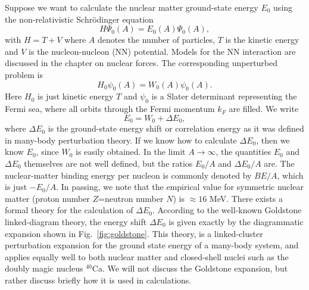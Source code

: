 Suppose we want to calculate the nuclear matter ground-state
energy $E_0$ using the non-relativistic Schr\"{o}dinger equation
\begin{equation}
      H\Psi_0(A)=E_0(A)\Psi_0(A),
\end{equation}
with $H=T+V$ where $A$ denotes the number of particles, $T$
is the kinetic energy and $V$ is
the nucleon-nucleon
(NN)  potential. Models for the NN interaction are discussed in the chapter on nuclear forces.
The corresponding unperturbed
problem is
\begin{equation}
      H_0\psi_0(A)=W_0(A)\psi_0(A).
\end{equation}
Here $H_0$ is just kinetic energy $T$ and $\psi_0$ is a Slater
determinant representing the Fermi sea, where all orbits through the
Fermi momentum $k_F$ are filled. We write
\begin{equation}
      E_0=W_0+\Delta E_0,
\end{equation}
where $\Delta E_0$ is the ground-state energy shift or correlation energy as it was defined in many-body perturbation theory.
If we know how to calculate $\Delta E_0$, then we know $E_0$, since
$W_0$ is easily obtained. In the limit $A\rightarrow \infty$,
the quantities $E_0$ and $\Delta E_0$ themselves are not well
defined, but the ratios $E_0/A$ and $\Delta E_0/A$ are. The
nuclear-matter binding energy per nucleon is commonly denoted
by $BE/A$, which is just $-E_0/A$. In passing, we note that
the empirical value for symmetric nuclear matter (proton number
$Z$=neutron number $N$) is $\approx 16$ MeV.
There exists a formal theory for the calculation of $\Delta E_0$.
According to the well-known Goldstone linked-diagram theory, the energy shift $\Delta E_0$ is given exactly by the
diagrammatic expansion shown in Fig.~\ref{fig:goldstone}. This theory,
is a linked-cluster perturbation expansion for the ground state
energy of a many-body system, and applies equally well to both
nuclear matter and closed-shell nuclei such as the doubly magic
nucleus $^{40}$Ca. 
We will not discuss the Goldstone expansion, but rather discuss
briefly how it is used in calculations.


